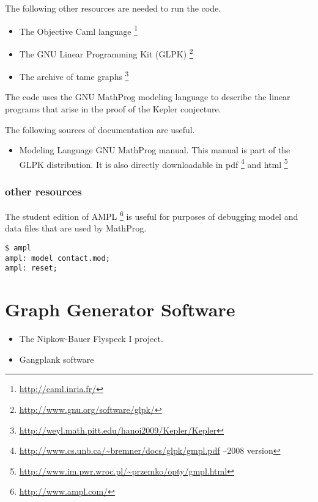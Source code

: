 The following other resources are needed to run the code.

\begin{itemize}
\item The Objective Caml language%
\footnote{\url{http://caml.inria.fr/}} %
\item The GNU Linear Programming Kit (GLPK)%
\footnote{\url{http://www.gnu.org/software/glpk/}} %
\item The archive of tame graphs%
\footnote{\url{http://weyl.math.pitt.edu/hanoi2009/Kepler/Kepler}}
\end{itemize}

The code uses the GNU MathProg modeling language to describe the linear programs that arise in the proof of the Kepler conjecture.

The following sources of documentation are useful.

\begin{itemize}
\item Modeling Language GNU MathProg manual.  This manual is part of the GLPK distribution.  It is also directly downloadable in pdf%
\footnote{\url{http://www.cs.unb.ca/~bremner/docs/glpk/gmpl.pdf} --2008 version} %
 and html%
\footnote{\url{http://www.im.pwr.wroc.pl/~przemko/opty/gmpl.html}} %
\end{itemize}

\subsection{other resources}

The student edition of AMPL%
\footnote{\url{http://www.ampl.com/}} %
is useful for 
purposes of debugging model and data files that are used by MathProg.

\begin{verbatim}
$ ampl
ampl: model contact.mod;
ampl: reset;
\end{verbatim}




\chapter{Graph Generator Software}


\begin{itemize}
\item The Nipkow-Bauer Flyspeck I project.
\item Gangplank software
\end{itemize}

